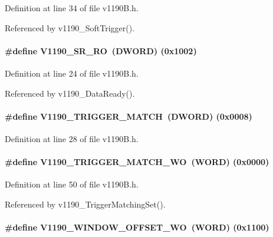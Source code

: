 Definition at line 34 of file v1190B.h.

Referenced by v1190\_\-SoftTrigger().
\paragraph[{V1190\_\-SR\_\-RO}]{\setlength{\rightskip}{0pt plus 5cm}\#define V1190\_\-SR\_\-RO~({\bf DWORD}) (0x1002)}\hfill\label{v1190B_8h_af144cd3aec4ec2ee43519dc3b8d85009}


Definition at line 24 of file v1190B.h.

Referenced by v1190\_\-DataReady().
\paragraph[{V1190\_\-TRIGGER\_\-MATCH}]{\setlength{\rightskip}{0pt plus 5cm}\#define V1190\_\-TRIGGER\_\-MATCH~({\bf DWORD}) (0x0008)}\hfill\label{v1190B_8h_a33c98d9cda792a258ab3a95d1eb6891e}


Definition at line 28 of file v1190B.h.
\paragraph[{V1190\_\-TRIGGER\_\-MATCH\_\-WO}]{\setlength{\rightskip}{0pt plus 5cm}\#define V1190\_\-TRIGGER\_\-MATCH\_\-WO~({\bf WORD}) (0x0000)}\hfill\label{v1190B_8h_aa39034e01bbc835a8a2bd9688909d309}


Definition at line 50 of file v1190B.h.

Referenced by v1190\_\-TriggerMatchingSet().
\paragraph[{V1190\_\-WINDOW\_\-OFFSET\_\-WO}]{\setlength{\rightskip}{0pt plus 5cm}\#define V1190\_\-WINDOW\_\-OFFSET\_\-WO~({\bf WORD}) (0x1100)}\hfill\label{v1190B_8h_a01fb6ad8db5823c7f993e695b543b622}


